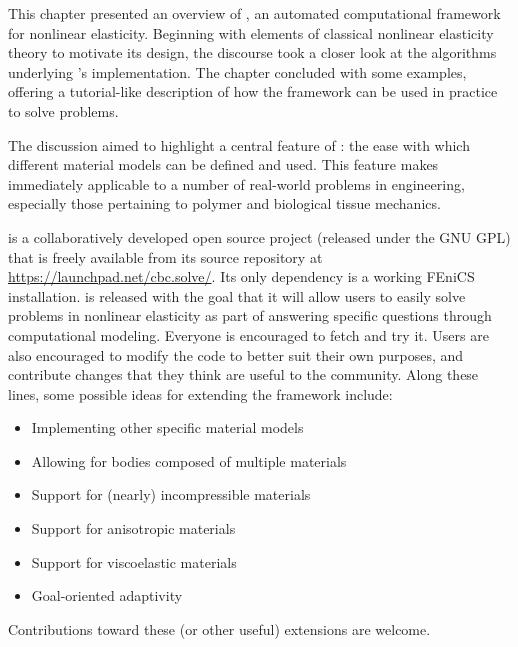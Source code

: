 This chapter presented an overview of \twist, an automated
computational framework for nonlinear elasticity. Beginning with
elements of classical nonlinear elasticity theory to motivate its
design, the discourse took a closer look at the algorithms underlying
\twist's implementation. The chapter concluded with some examples,
offering a tutorial-like description of how the framework can be used
in practice to solve problems.

The discussion aimed to highlight a central feature of \twist: the
ease with which different material models can be defined and
used. This feature makes \twist{} immediately applicable to a number
of real-world problems in engineering, especially those pertaining to
polymer and biological tissue mechanics.

\twist{} is a collaboratively developed open source project (released
under the GNU GPL) that is freely available from its source repository
at \url{https://launchpad.net/cbc.solve/}. Its only dependency is a
working FEniCS installation. \twist{} is released with the goal that
it will allow users to easily solve problems in nonlinear elasticity
as part of answering specific questions through computational
modeling. Everyone is encouraged to fetch and try it. Users are also
encouraged to modify the code to better suit their own purposes, and
contribute changes that they think are useful to the community. Along
these lines, some possible ideas for extending the framework include:
\begin{itemize}
\item Implementing other specific material models
\item Allowing for bodies composed of multiple materials
\item Support for (nearly) incompressible materials
\item Support for anisotropic materials
\item Support for viscoelastic materials
\item Goal-oriented adaptivity
\end{itemize}
Contributions toward these (or other useful) extensions are
welcome.
\processqueries
\endgroup

